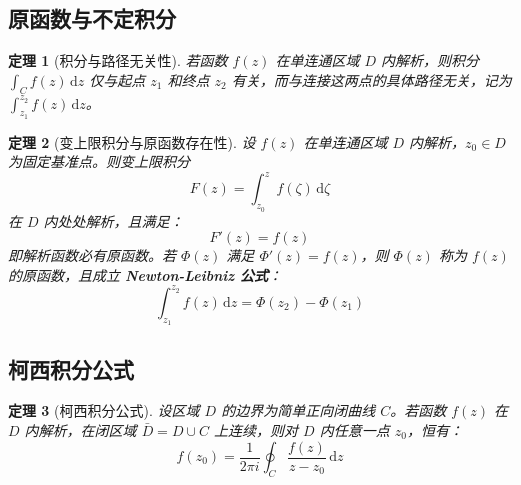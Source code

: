 \documentclass[11pt,a4paper,fontset=fandol]{ctexart}
\newtheorem{theorem}{定理}[section]
\theoremstyle{remark}
\begin{document}
\subsection{原函数与不定积分}

\begin{theorem}[积分与路径无关性]
若函数 $f(z)$ 在单连通区域 $D$ 内解析，则积分 $\int_C f(z)\,\mathrm{d}z$ 仅与起点 $z_1$ 和终点 $z_2$ 有关，而与连接这两点的具体路径无关，记为 $\int_{z_1}^{z_2} f(z)\,\mathrm{d}z$。
\end{theorem}

\begin{theorem}[变上限积分与原函数存在性]
设 $f(z)$ 在单连通区域 $D$ 内解析，$z_0 \in D$ 为固定基准点。则变上限积分
\begin{equation}
    F(z) = \int_{z_0}^z f(\zeta)\,\mathrm{d}\zeta
\end{equation}
在 $D$ 内处处解析，且满足：
\begin{equation}
    F'(z) = f(z)
\end{equation}
即解析函数必有原函数。若 $\Phi(z)$ 满足 $\Phi'(z) = f(z)$，则 $\Phi(z)$ 称为 $f(z)$ 的原函数，且成立 \textbf{Newton-Leibniz 公式}：
\begin{equation}
    \int_{z_1}^{z_2} f(z)\,\mathrm{d}z = \Phi(z_2) - \Phi(z_1)
\end{equation}
\end{theorem}

\subsection{柯西积分公式}

\begin{theorem}[柯西积分公式]
设区域 $D$ 的边界为简单正向闭曲线 $C$。若函数 $f(z)$ 在 $D$ 内解析，在闭区域 $\bar{D} = D \cup C$ 上连续，则对 $D$ 内任意一点 $z_0$，恒有：
\begin{equation}
    f(z_0) = \frac{1}{2\pi i} \oint_C \frac{f(z)}{z - z_0}\,\mathrm{d}z
\end{equation}
\end{theorem}
\end{document}

